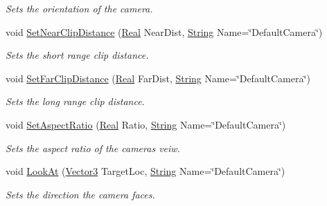 \begin{DoxyCompactItemize}
\begin{DoxyCompactList}\small\item\em Sets the orientation of the camera. \item\end{DoxyCompactList}\item 
void \hyperlink{classphys_1_1CameraManager_ad639c275a2bb1c6c05a8800f8e8412c6}{SetNearClipDistance} (\hyperlink{namespacephys_af7eb897198d265b8e868f45240230d5f}{Real} NearDist, \hyperlink{namespacephys_aa03900411993de7fbfec4789bc1d392e}{String} Name=\char`\"{}DefaultCamera\char`\"{})
\begin{DoxyCompactList}\small\item\em Sets the short range clip distance. \item\end{DoxyCompactList}\item 
void \hyperlink{classphys_1_1CameraManager_a809e4e31a9ad42afd620e95508ad78d7}{SetFarClipDistance} (\hyperlink{namespacephys_af7eb897198d265b8e868f45240230d5f}{Real} FarDist, \hyperlink{namespacephys_aa03900411993de7fbfec4789bc1d392e}{String} Name=\char`\"{}DefaultCamera\char`\"{})
\begin{DoxyCompactList}\small\item\em Sets the long range clip distance. \item\end{DoxyCompactList}\item 
void \hyperlink{classphys_1_1CameraManager_af16862039fffd900b9c7acc20527cac8}{SetAspectRatio} (\hyperlink{namespacephys_af7eb897198d265b8e868f45240230d5f}{Real} Ratio, \hyperlink{namespacephys_aa03900411993de7fbfec4789bc1d392e}{String} Name=\char`\"{}DefaultCamera\char`\"{})
\begin{DoxyCompactList}\small\item\em Sets the aspect ratio of the cameras veiw. \item\end{DoxyCompactList}\item 
void \hyperlink{classphys_1_1CameraManager_a885a499a53c3543b6bf429583a2cb54c}{LookAt} (\hyperlink{classphys_1_1Vector3}{Vector3} TargetLoc, \hyperlink{namespacephys_aa03900411993de7fbfec4789bc1d392e}{String} Name=\char`\"{}DefaultCamera\char`\"{})
\begin{DoxyCompactList}\small\item\em Sets the direction the camera faces. \item\end{DoxyCompactList}\item 

\end{DoxyCompactItemize}
